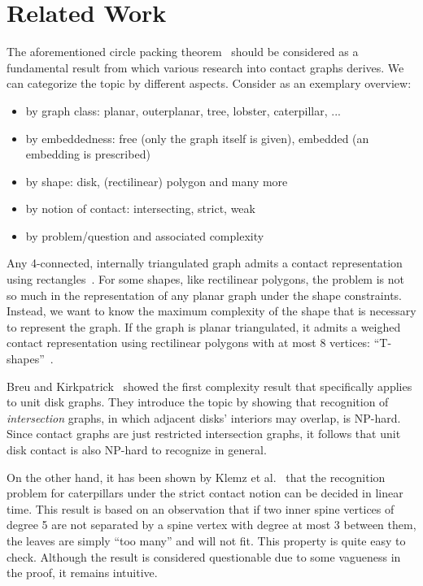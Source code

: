 
\chapter{Related Work}
\label{chp:related-work}

The aforementioned circle packing theorem~\cite{Koebe1936} should be considered as a fundamental result from which various research into contact graphs derives. We can categorize the topic by different aspects. Consider as an exemplary overview:

\begin{itemize}
    \item by graph class: planar, outerplanar, tree, lobster, caterpillar, ...
    \item by embeddedness: free (only the graph itself is given), embedded (an embedding is prescribed)
    \item by shape: disk, (rectilinear) polygon and many more
    \item by notion of contact: intersecting, strict, weak
    \item by problem/question and associated complexity
\end{itemize}


Any 4-connected, internally triangulated graph admits a contact representation using rectangles~\cite{kozminski_rectangular_1985}. For some shapes, like rectilinear polygons, the problem is not so much in the representation of any planar graph under the shape constraints. Instead, we want to know the maximum complexity of the shape that is necessary to represent the graph. If the graph is planar triangulated, it admits a weighed contact representation using rectilinear polygons with at most 8 vertices: ``T-shapes''~\cite{alam_computing_2013}.

Breu and Kirkpatrick~\cite{Breu1998} showed the first complexity result that specifically applies to unit disk graphs. They introduce the topic by showing that recognition of \emph{intersection} graphs, in which adjacent disks' interiors may overlap, is NP-hard. Since contact graphs are just restricted intersection graphs, it follows that unit disk contact is also NP-hard to recognize in general.

On the other hand, it has been shown by Klemz et al.~\cite{Klemz2015} that the recognition problem for caterpillars under the strict contact notion can be decided in linear time. This result is based on an observation that if two inner spine vertices of degree 5 are not separated by a spine vertex with degree at most 3 between them, the leaves are simply ``too many'' and will not fit. This property is quite easy to check. Although the result is considered questionable due to some vagueness in the proof, it remains intuitive.

